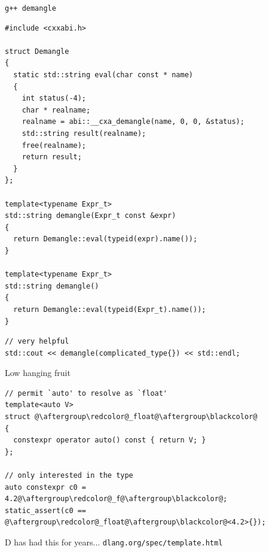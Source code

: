 \documentclass[xcolor=dvipsnames]{beamer}
\begin{document}
\begin{frame}[fragile]{\texttt{g++ demangle}}
\begin{lstlisting}[basicstyle=\tiny\ttfamily]
#include <cxxabi.h>

struct Demangle
{
  static std::string eval(char const * name)
  {
    int status(-4);
    char * realname;
    realname = abi::__cxa_demangle(name, 0, 0, &status);
    std::string result(realname);
    free(realname);
    return result;
  }
};

template<typename Expr_t>
std::string demangle(Expr_t const &expr)
{
  return Demangle::eval(typeid(expr).name());
}

template<typename Expr_t>
std::string demangle()
{
  return Demangle::eval(typeid(Expr_t).name());
}
\end{lstlisting}

\begin{lstlisting}[basicstyle=\tiny\ttfamily]
// very helpful
std::cout << demangle(complicated_type{}) << std::endl;
\end{lstlisting}
\end{frame}


\begin{frame}[fragile]{Low hanging fruit}
\begin{lstlisting}
// permit `auto' to resolve as `float'
template<auto V>
struct @\aftergroup\redcolor@_float@\aftergroup\blackcolor@
{
  constexpr operator auto() const { return V; }
};

// only interested in the type
auto constexpr c0 = 4.2@\aftergroup\redcolor@_f@\aftergroup\blackcolor@;
static_assert(c0 == @\aftergroup\redcolor@_float@\aftergroup\blackcolor@<4.2>{});
\end{lstlisting}

\vspace{5mm}
\footnotesize{D has had this for years...}\newline
\footnotesize{\texttt{dlang.org/spec/template.html}}
\end{frame}
\end{document}
